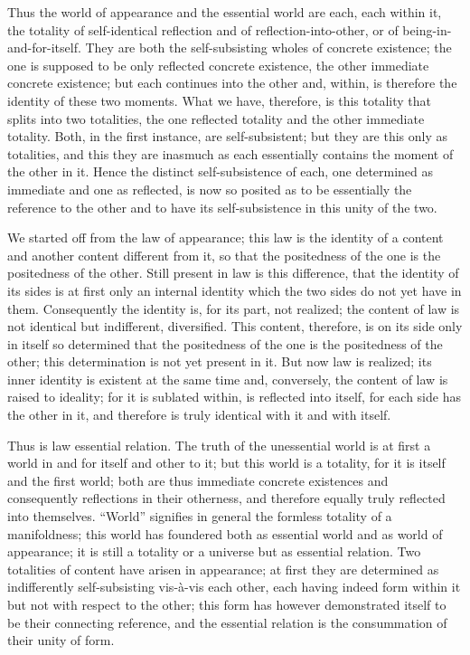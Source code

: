 Thus the world of appearance and the essential world are
each, each within it, the totality of
self-identical reflection and of reflection-into-other,
or of being-in-and-for-itself.
They are both the self-subsisting wholes of concrete existence;
the one is supposed to be only reflected concrete existence,
the other immediate concrete existence;
but each continues into the other and, within, is
therefore the identity of these two moments.
What we have, therefore, is this totality
that splits into two totalities,
the one reflected totality and the other immediate totality.
Both, in the first instance, are self-subsistent;
but they are this only as totalities,
and this they are inasmuch as each essentially contains
the moment of the other in it.
Hence the distinct self-subsistence of each,
one determined as immediate and one as reflected,
is now so posited as to be essentially the reference to the other
and to have its self-subsistence in this unity of the two.

We started off from the law of appearance;
this law is the identity of a content
and another content different from it,
so that the positedness of the one
is the positedness of the other.
Still present in law is this difference,
that the identity of its sides is
at first only an internal identity
which the two sides do not yet have in them.
Consequently the identity is, for its part, not realized;
the content of law is not identical
but indifferent, diversified.
This content, therefore, is on its side only in itself
so determined that the positedness of the one is
the positedness of the other;
this determination is not yet present in it.
But now law is realized;
its inner identity is existent at the same time
and, conversely, the content of law is raised to ideality;
for it is sublated within, is reflected into itself,
for each side has the other in it,
and therefore is truly identical
with it and with itself.

Thus is law essential relation.
The truth of the unessential world is at first
a world in and for itself and other to it;
but this world is a totality,
for it is itself and the first world;
both are thus immediate concrete existences
and consequently reflections in their otherness,
and therefore equally truly reflected into themselves.
“World” signifies in general
the formless totality of a manifoldness;
this world has foundered both as essential world
and as world of appearance;
it is still a totality or a universe
but as essential relation.
Two totalities of content have arisen in appearance;
at first they are determined as
indifferently self-subsisting vis-à-vis each other,
each having indeed form within it
but not with respect to the other;
this form has however demonstrated
itself to be their connecting reference,
and the essential relation is
the consummation of their unity of form.

